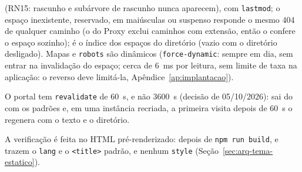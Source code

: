 (RN15: rascunho e subárvore de rascunho nunca aparecem), com \texttt{lastmod}; o espaço inexistente, reservado, em maiúsculas ou suspenso responde o mesmo 404 de qualquer caminho (o  do Proxy exclui caminhos com extensão, então o  confere o espaço sozinho);  é o índice dos espaços do diretório (vazio com o diretório desligado). Mapas e \texttt{robots} são dinâmicos (\texttt{force-dynamic}: sempre em dia, sem entrar na invalidação do espaço; cerca de 6~ms por leitura, sem limite de taxa na aplicação: o  reverso deve limitá-la, Apêndice~\ref{ap:implantacao}).

O portal tem \texttt{revalidate} de 60~s, e não 3600~s (decisão de 05/10/2026): sai do  com os padrões e, em uma instância recriada, a primeira visita depois de 60~s o regenera com o texto e o diretório.

A verificação é feita no HTML pré-renderizado: depois de \texttt{npm run build},  e  trazem o \texttt{lang} e o \texttt{<title>} padrão, e nenhum \texttt{style} (Seção~\ref{sec:arq-tema-estatico}).
